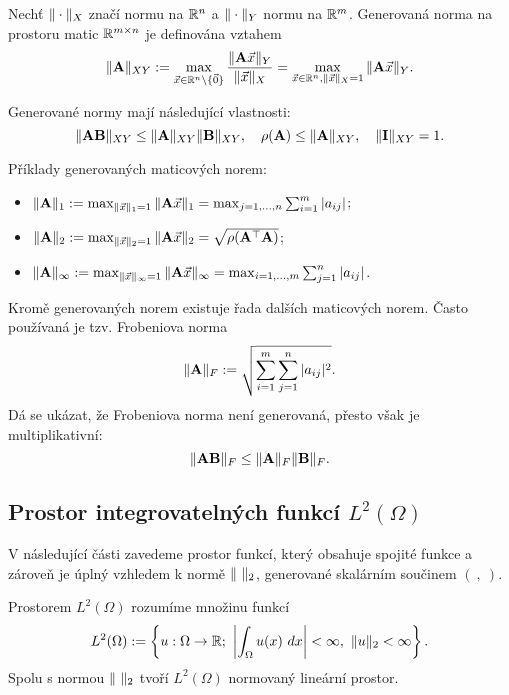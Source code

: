 \begin{df}
Nechť $\|\cdot\|_X$ značí normu na $\mathbb R^n$ a $\|\cdot\|_Y$ normu na $\mathbb R^m$.
Generovaná norma na prostoru matic $\mathbb R^{m\times n}$  je definována vztahem
\[ \|\mathbf{A}\|_{XY} := \max_{\vec{x}\in\mathbb R^n\setminus\{\vec 0\}}\frac{\|\mathbf{A}\vec{x}\|_Y}{\|\vec{x}\|_X} = \max_{\vec{x}\in\mathbb R^n,\|\vec{x}\|_X=1}\|\mathbf{A}\vec{x}\|_Y. \]
\end{df}
Generované normy mají následující vlastnosti:
\[ \|\mathbf{A}\mathbf{B}\|_{XY} \le \|\mathbf{A}\|_{XY}\|\mathbf{B}\|_{XY},\quad \rho(\mathbf{A})\le\|\mathbf{A}\|_{XY},\quad \|\mathbf{I}\|_{XY}=1. \]
\begin{ex}
Příklady generovaných maticových norem:
\begin{itemize}
\item $\|\mathbf{A}\|_1:=\max_{\|\vec{x}\|_1=1}\|\mathbf{A}\vec{x}\|_1 = \max_{j=1,\ldots,n}\sum_{i=1}^m|a_{ij}|$;
\item $\|\mathbf{A}\|_2:=\max_{\|\vec{x}\|_2=1}\|\mathbf{A}\vec{x}\|_2 = \sqrt{\rho(\mathbf{A}^\top\mathbf{A})}$;
\item $\|\mathbf{A}\|_\infty:=\max_{\|\vec{x}\|_\infty=1}\|\mathbf{A}\vec{x}\|_\infty = \max_{i=1,\ldots,m}\sum_{j=1}^n|a_{ij}|$.
\end{itemize}
\end{ex}
Kromě generovaných norem existuje řada dalších maticových norem.
Často používaná je tzv. Frobeniova norma
\[ \|\mathbf{A}\|_F:=\sqrt{\sum_{i=1}^m\sum_{j=1}^n|a_{ij}|^2}. \]
Dá se ukázat, že Frobeniova norma není generovaná, přesto však je multiplikativní:
\[ \|\mathbf{A}\mathbf{B}\|_F \le \|\mathbf{A}\|_F\|\mathbf{B}\|_F. \]






\subsection{Prostor integrovatelných funkcí $L^2(\Omega)$}

V následující části zavedeme prostor funkcí, který obsahuje spojité funkce a zároveň je úplný vzhledem k normě $\|\ \|_2$, generované skalárním součinem $(\ ,\ )$.

\begin{df}
\label{df:Lp}
Prostorem $L^2(\Omega)$ rozumíme množinu funkcí
\[ L^2(\Omega):=\left\{u:\Omega\rightarrow\mathbb R;~\left|\int_\Omega u(x)~dx\right|<\infty,~\|u\|_2<\infty \right\}. \]
Spolu s normou $\|\ \|_2$ tvoří $L^2(\Omega)$ normovaný lineární prostor.
\end{df}

